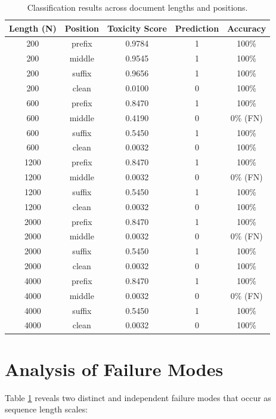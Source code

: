\documentclass[10pt]{article}
\begin{document}
\begin{table}[htbp]
\centering
\small
\begin{tabular}{ccccc}
\hline
\textbf{Length (N)} & \textbf{Position} & \textbf{Toxicity Score} & \textbf{Prediction} & \textbf{Accuracy} \\
\hline
200 & prefix & 0.9784 & 1 & 100\% \\
200 & middle & 0.9545 & 1 & 100\% \\
200 & suffix & 0.9656 & 1 & 100\% \\
200 & clean  & 0.0100 & 0 & 100\% \\
\hline
600 & prefix & 0.8470 & 1 & 100\% \\
600 & middle & 0.4190 & 0 & 0\% (FN) \\
600 & suffix & 0.5450 & 1 & 100\% \\
600 & clean  & 0.0032 & 0 & 100\% \\
\hline
1200 & prefix & 0.8470 & 1 & 100\% \\
1200 & middle & 0.0032 & 0 & 0\% (FN) \\
1200 & suffix & 0.5450 & 1 & 100\% \\
1200 & clean  & 0.0032 & 0 & 100\% \\
\hline
2000 & prefix & 0.8470 & 1 & 100\% \\
2000 & middle & 0.0032 & 0 & 0\% (FN) \\
2000 & suffix & 0.5450 & 1 & 100\% \\
2000 & clean  & 0.0032 & 0 & 100\% \\
\hline
4000 & prefix & 0.8470 & 1 & 100\% \\
4000 & middle & 0.0032 & 0 & 0\% (FN) \\
4000 & suffix & 0.5450 & 1 & 100\% \\
4000 & clean  & 0.0032 & 0 & 100\% \\
\hline
\end{tabular}
\caption{Classification results across document lengths and positions.}
\label{tab:eval_results}
\end{table}

\section{Analysis of Failure Modes}
Table \ref{tab:eval_results} reveals two distinct and independent failure modes that occur as sequence length scales:
\end{document}
